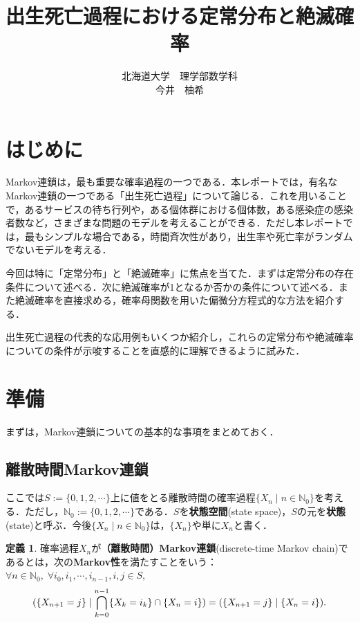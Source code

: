 \documentclass[dvipdfmx]{jsarticle}
\title{\bf 出生死亡過程における定常分布と絶滅確率}
\author{北海道大学　理学部数学科 \\ 今井　柚希}
\date{}
\numberwithin{equation}{section}
\theoremstyle{definition}
\newtheorem{dfn}[thm]{定義}
\newcommand{\N}{\mathbb{N}}
\let\P\relax
\newcommand{\P}{\mathbb{P}}
\newcommand{\0}{\bm{0}}
\newcommand{\1}{\bm{1}}
\begin{document}
\maketitle{}

\newpage

\section{はじめに}
Markov連鎖は，最も重要な確率過程の一つである．本レポートでは，有名なMarkov連鎖の一つである「出生死亡過程」について論じる．これを用いることで，あるサービスの待ち行列や，ある個体群における個体数，ある感染症の感染者数など，さまざまな問題のモデルを考えることができる．ただし本レポートでは，最もシンプルな場合である，時間斉次性があり，出生率や死亡率がランダムでないモデルを考える．

今回は特に「定常分布」と「絶滅確率」に焦点を当てた．まずは定常分布の存在条件について述べる．次に絶滅確率が1となるか否かの条件について述べる．また絶滅確率を直接求める，確率母関数を用いた偏微分方程式的な方法を紹介する．

出生死亡過程の代表的な応用例もいくつか紹介し，これらの定常分布や絶滅確率についての条件が示唆することを直感的に理解できるように試みた．

\section{準備}
まずは，Markov連鎖についての基本的な事項をまとめておく．

\subsection{離散時間Markov連鎖}
ここでは$S := \{0,1,2, \cdots \}$上に値をとる離散時間の確率過程$\{X_n \mid n \in \N_0\}$を考える．ただし，$\N_0 := \{0,1,2, \cdots \}$である．$S$を{\bf 状態空間}(state space)，$S$の元を{\bf 状態}(state)と呼ぶ．今後$\{X_n \mid n \in \N_0\}$は，$\{X_n\}$や単に$X_n$と書く．

\begin{dfn}
  確率過程$X_n$が{\bf （離散時間）Markov連鎖}(discrete-time Markov chain)であるとは，次の{\bf Markov性}を満たすことをいう：$\forall n \in \N_0, \; \forall i_0, i_1, \cdots, i_{n-1}, i, j \in S,$
  \begin{gather}
    \P( \{X_{n+1} = j\} \mid \bigcap_{k=0}^{n-1} \{X_k = i_k\} \cap \{X_n = i\} ) = \P( \{X_{n+1} = j\} \mid \{X_n = i\} ).
  \end{gather}
\end{dfn}
\end{document}
